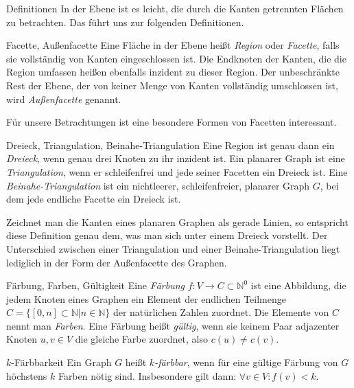 \begin{chapter}{Definitionen}
  In der Ebene ist es leicht, die durch die Kanten getrennten Flächen zu betrachten. Das führt uns zur folgenden Definitionen.
  
  \begin{definition}{Facette, Außenfacette}
   Eine Fläche in der Ebene heißt \textit{Region} oder \textit{Facette}, falls sie vollständig von Kanten eingeschlossen ist. Die Endknoten der Kanten, die die Region umfassen heißen ebenfalls inzident zu dieser Region. Der unbeschränkte Rest der Ebene, der von keiner Menge von Kanten vollständig umschlossen ist, wird \textit{Außenfacette} genannt.
  \end{definition}
  
  Für unsere Betrachtungen ist eine besondere Formen von Facetten interessant. 
  
  \begin{definition}{Dreieck, Triangulation, Beinahe-Triangulation}
   Eine Region ist genau dann ein \textit{Dreieck}, wenn genau drei Knoten zu ihr inzident ist. Ein planarer Graph ist eine \textit{Triangulation}, wenn er schleifenfrei und jede seiner Facetten ein Dreieck ist. Eine \textit{Beinahe-Triangulation} ist ein nichtleerer, schleifenfreier, planarer Graph $G$, bei dem jede endliche Facette ein Dreieck ist. 
  \end{definition}
  
  Zeichnet man die Kanten eines planaren Graphen als gerade Linien, so entspricht diese Definition genau dem, was man sich unter einem Dreieck vorstellt. Der Unterschied zwischen einer Triangulation und einer Beinahe-Triangulation liegt lediglich in der Form der Außenfacette des Graphen. 
  
  \begin{definition}{Färbung, Farben, Gültigkeit}
   Eine \textit{Färbung} $f: V \rightarrow C \subset \mathbb{N}^0$ ist eine Abbildung, die jedem Knoten eines Graphen ein Element der endlichen Teilmenge $C = \{[0,n] \subset \mathbb{N}| n \in \mathbb{N}\}$ der natürlichen Zahlen zuordnet. Die Elemente von $C$ nennt man \textit{Farben}. Eine Färbung heißt \textit{gültig}, wenn sie keinem Paar adjazenter Knoten $u,v \in V$ die gleiche Farbe zuordnet, also $c(u) \neq c(v)$. 
  \end{definition}
  
  \begin{definition}{$k$-Färbbarkeit}
   Ein Graph $G$ heißt \textit{$k$-färbbar}, wenn für eine gültige Färbung von $G$ höchstens $k$ Farben nötig sind. Insbesondere gilt dann: $\forall v \in V: f(v) < k$.
  \end{definition}
  

\end{chapter}
